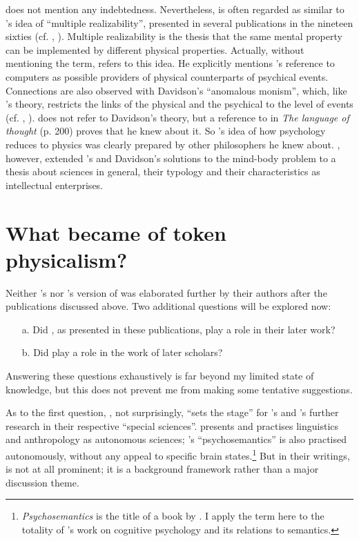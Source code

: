 \documentclass[output=paper]{langscibook}
\begin{document}
{\Fodor} does not mention any indebtedness. Nevertheless,  is often regarded as similar to {\Putnam}'s idea of ``multiple realizability'', presented in several publications in the nineteen sixties (cf. \citealt{Putnam1960}, \citealt[xiii]{LoewerRey1991}). Multiple realizability is the thesis that the same mental property can be implemented by different physical properties. Actually, without mentioning the term, \citet[105--106]{Fodor1974} refers to this idea. He explicitly mentions {\Putnam}'s reference to computers as possible providers of physical counterparts of psychical events. Connections are also observed with Davidson's ``anomalous monism'', which, like {\Fodor}'s theory, restricts the links of the physical and the psychical to the level of events (cf. \citealt{Davidson1970}, \citealt[xxxi]{LoewerRey1991}). {\Fodor} does not refer to Davidson's theory, but a reference to \citet{Davidson1970} in \emph{The language of thought} (p. 200) proves that he knew about it. So {\Fodor}'s idea of how psychology reduces to physics was clearly prepared by other philosophers he knew about. {\Fodor}, however, extended {\Putnam}'s and Davidson's solutions to the mind-body problem to a thesis about sciences in general, their typology and their characteristics as intellectual enterprises.

\section{What became of token physicalism?}
\label{sec:elffers:whatbecame}

Neither {\Sapir}'s nor {\Fodor}'s version of  was elaborated further by their authors after the publications discussed above. Two additional questions will be explored now:

\begin{enumerate}
    \item[a.] Did , as presented in these publications, play a role in their later work?
    \item[b.] Did  play a role in the work of later scholars?
\end{enumerate}

Answering these questions exhaustively is far beyond my limited state of knowledge, but this does not prevent me from making some tentative suggestions.

As to the first question, , not surprisingly, ``sets the stage'' for {\Sapir}'s and {\Fodor}'s further research in their respective ``special sciences''. {\Sapir} presents and practises linguistics and anthropology as autonomous sciences; {\Fodor}'s ``psychosemantics'' is also practised autonomously, without any appeal to specific brain states.\footnote{\emph{Psychosemantics} is the title of a \citeyear{Fodor1987} book by {\Fodor}. I apply the term here to the totality of {\Fodor}'s work on cognitive psychology and its relations to semantics.} But in their writings,  is not at all prominent; it is a background framework rather than a major discussion theme.
\end{document}
